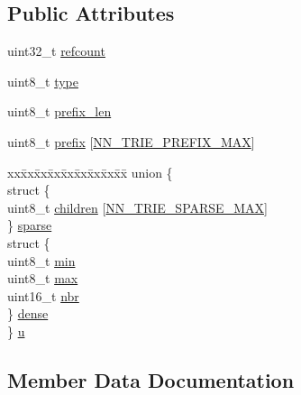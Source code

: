 \subsection*{Public Attributes}
\begin{DoxyCompactItemize}
\item 
uint32\+\_\+t \hyperlink{structnn__trie__node_a6dc1089a8be3d504fab316eb5c550ac8}{refcount}
\item 
uint8\+\_\+t \hyperlink{structnn__trie__node_a1ad8cbb3a89780ea9958b48ecc0a2f45}{type}
\item 
uint8\+\_\+t \hyperlink{structnn__trie__node_a15bfe2d362609805b0a38881413347e9}{prefix\+\_\+len}
\item 
uint8\+\_\+t \hyperlink{structnn__trie__node_a7aefc668cabcbce6cad09c5e77637d31}{prefix} \mbox{[}\hyperlink{trie_8h_a164802a5386c0f04e37a9eb118c7707c}{N\+N\+\_\+\+T\+R\+I\+E\+\_\+\+P\+R\+E\+F\+I\+X\+\_\+\+M\+AX}\mbox{]}
\item 
\begin{tabbing}
xx\=xx\=xx\=xx\=xx\=xx\=xx\=xx\=xx\=\kill
union \{\\
\>struct \{\\
\>\>uint8\_t \hyperlink{structnn__trie__node_a452a8682dddb092a2a60fa43c15aaee6}{children} \mbox{[}\hyperlink{trie_8h_a54988260b3cd5b5f2321f25c74d369fe}{NN\_TRIE\_SPARSE\_MAX}\mbox{]}\\
\>\} \hyperlink{structnn__trie__node_ae430bf1862fd92f30bd991647645fc05}{sparse}\\
\>struct \{\\
\>\>uint8\_t \hyperlink{structnn__trie__node_a105e3aba00cda22951192c6fb12b43b8}{min}\\
\>\>uint8\_t \hyperlink{structnn__trie__node_ad164df8e7446669447ce5c8d6575fdc0}{max}\\
\>\>uint16\_t \hyperlink{structnn__trie__node_aa1b62c9e7cff55e4b2284124345c03ec}{nbr}\\
\>\} \hyperlink{structnn__trie__node_a431468d12b2188d837c28b75be39e323}{dense}\\
\} \hyperlink{structnn__trie__node_a2769fd778428eb659a86fdc725c6fbe4}{u}\\

\end{tabbing}\end{DoxyCompactItemize}


\subsection{Member Data Documentation}
